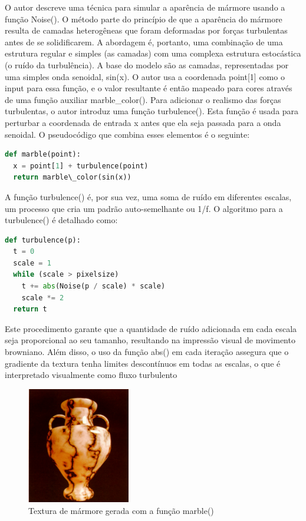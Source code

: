 O autor descreve uma técnica para simular a aparência de mármore usando a função Noise(). O método parte do princípio de que a aparência do mármore resulta de camadas heterogêneas que foram deformadas por forças turbulentas antes de se solidificarem. A abordagem é, portanto, uma combinação de uma estrutura regular e simples (as camadas) com uma complexa estrutura estocástica (o ruído da turbulência). A base do modelo são as camadas, representadas por uma simples onda senoidal, sin(x). O autor usa a coordenada point[1] como o input para essa função, e o valor resultante é então mapeado para cores através de uma função auxiliar marble\_color(). Para adicionar o realismo das forças turbulentas, o autor introduz uma função turbulence(). Esta função é usada para perturbar a coordenada de entrada x antes que ela seja passada para a onda senoidal. O pseudocódigo que combina esses elementos é o seguinte:

\begin{lstlisting}[language=Python, caption={Pseudocódigo da função turbulence()}]
def marble(point):
  x = point[1] + turbulence(point)
  return marble\_color(sin(x))
\end{lstlisting}

A função turbulence() é, por sua vez, uma soma de ruído em diferentes escalas, um processo que cria um padrão auto-semelhante ou 1/f. O algoritmo para a turbulence() é detalhado como:

\begin{lstlisting}[language=Python, caption={Pseudocódigo da função turbulence()}]
def turbulence(p):
  t = 0
  scale = 1
  while (scale > pixelsize)
    t += abs(Noise(p / scale) * scale)
    scale *= 2
  return t
\end{lstlisting}

Este procedimento garante que a quantidade de ruído adicionada em cada escala seja proporcional ao seu tamanho, resultando na impressão visual de movimento browniano. Além disso, o uso da função abs() em cada iteração assegura que o gradiente da textura tenha limites descontínuos em todas as escalas, o que é interpretado visualmente como fluxo turbulento

\begin{figure}[H]
    \centering
    \includegraphics[width=0.4\textwidth]{img/marble.png}
    \caption{Textura de mármore gerada com a função marble()}
    \label{fig:marble_texture}
\end{figure}

